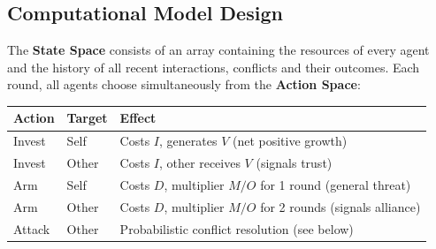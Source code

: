 \subsection{Computational Model Design}
%
%

The \textbf{State Space} consists of an array containing the resources of every agent and the history of all recent interactions, conflicts and their outcomes. Each round, all agents choose simultaneously from the \textbf{Action Space}:

\begin{table}[h]
\centering
\begin{tabular}{@{}llp{10cm}@{}}
\toprule
\textbf{Action} & \textbf{Target} & \textbf{Effect} \\
\midrule
Invest & Self & Costs $I$, generates $V$ (net positive growth) \\
Invest & Other & Costs $I$, other receives $V$ (signals trust) \\
\midrule
Arm & Self & Costs $D$, multiplier $M/O$ for 1 round (general threat) \\
Arm & Other & Costs $D$, multiplier $M/O$ for 2 rounds (signals alliance) \\
\midrule
Attack & Other & Probabilistic conflict resolution (see below) \\
\bottomrule
\end{tabular}
\end{table}

